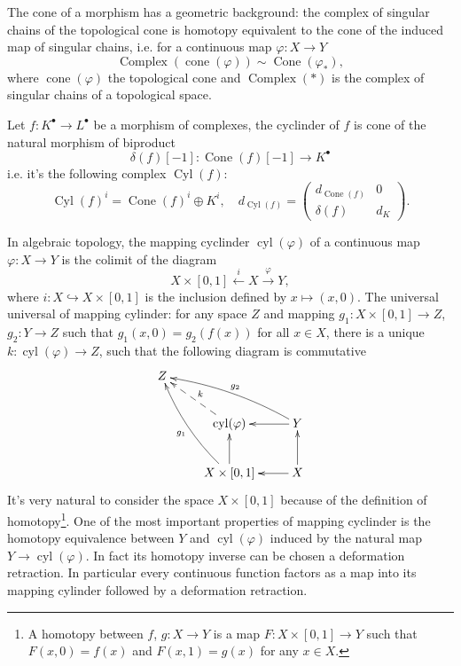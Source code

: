 The cone of a morphism has a geometric background: 
the complex of singular chains of the topological cone is homotopy equivalent to the cone of the induced map of singular chains, i.e. for a continuous map $\varphi:X\to Y$
\[
	\operatorname{Complex}(\operatorname{cone}(\varphi)) 
	\sim \operatorname{Cone}(\varphi_*),
\]
where $\operatorname{cone}(\varphi)$ the topological cone and 
$\operatorname{Complex}(*)$ is the complex of singular chains of a topological space.


\begin{definition}[Cyclinder]
	Let $f:K^\bullet\to L^\bullet$ be a morphism of complexes,
	the cyclinder of $f$ is cone of the natural morphism of biproduct
	\[
		\delta(f)[-1]:\operatorname{Cone}(f)[-1] \to K^\bullet
	\]
	i.e. it's the following complex $\operatorname{Cyl}(f)$:
	\[
		\operatorname{Cyl}(f)^i=\operatorname{Cone}(f)^i\oplus K^{i} ,\quad
		d_{\operatorname{Cyl}(f)}=\begin{pmatrix}
			d_{\operatorname{Cone}(f)}&0\\
			\delta(f) & d_{K}
		\end{pmatrix}.
	\]
\end{definition}

In algebraic topology, the mapping cyclinder $\operatorname{cyl}(\varphi)$ of
a continuous map $\varphi:X\to Y$ is the colimit of the diagram
\[
	X\times [0,1] \xleftarrow{i} X \xrightarrow{\varphi} Y,
\]
where $i:X\hookrightarrow X\times [0,1]$ is the inclusion defined by $x\mapsto (x,0)$. 
The universal universal of mapping cylinder:
for any space $Z$ and mapping $g_1:X\times [0,1]\to Z$, $g_2:Y\to Z$ such that 
$g_1(x,0)=g_2(f(x))$ for all $x\in X$, there is a unique $k:\operatorname{cyl}(\varphi)\to Z$,
such that the following diagram is commutative
\[
	\xymatrix{
		Z &  & \\
		  & \operatorname{cyl}(\varphi)\ar@{-->}[ul]_k & Y\ar[l]\ar@/_/[llu]_{g_2}\\
		  & X\times [0,1]\ar[u]\ar@/^/[luu]^{g_1} & X\ar[u]\ar[l]
	}
\]
It's very natural to consider the space $X\times [0,1]$ because of the definition
of homotopy\footnote{A homotopy between $f$, $g:X\to Y$ is a map $F:X\times [0,1]\to Y$
such that $F(x,0)=f(x)$ and $F(x,1)=g(x)$ for any $x\in X$.}. 
One of the most important properties of mapping cyclinder is the homotopy equivalence between $Y$
and $\operatorname{cyl}(\varphi)$ induced by the natural map $Y\to \operatorname{cyl}(\varphi)$.
In fact its homotopy inverse can be chosen a deformation retraction. In particular every continuous function factors as a map into its mapping cylinder followed by a deformation retraction.

